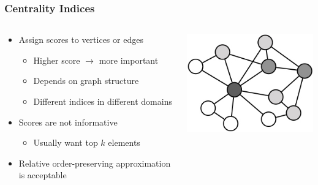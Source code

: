 \documentclass{beamer}
\begin{document}
\begin{frame}
\frametitle{Centrality Indices}


\begin{columns}
\begin{column}{0.6\textwidth}
	\begin{itemize}
		\item Assign scores to vertices or edges
		\begin{itemize}
			\item Higher score $\rightarrow$ more important
			\item Depends on graph structure
			\item Different indices in different domains
		\end{itemize}
		\item Scores are not informative
		\begin{itemize}
			\item Usually want top $k$ elements
		\end{itemize}
		\item Relative order-preserving approximation is acceptable
	\end{itemize}
\end{column}
\begin{column}{0.4\textwidth}  %
\begin{center}
	\includegraphics[width=1.0\textwidth]{centrality_greyscale}
\end{center}
\end{column}

\end{columns}
\end{frame}
\end{document}
